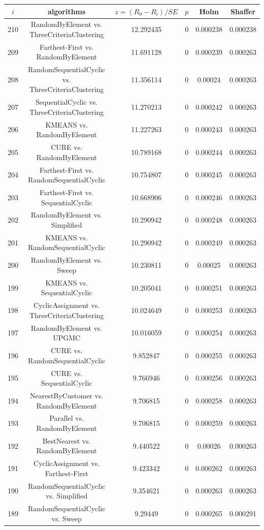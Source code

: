\documentclass[a4paper,10pt]{article}
\begin{document}
\begin{landscape}
\begin{table}[!htp]
\centering\scriptsize
\begin{tabular}{cccccc}
$i$&algorithms&$z=(R_0 - R_i)/SE$&$p$&Holm&Shaffer\\
\hline210&RandomByElement vs. ThreeCriteriaClustering&12.292435&0&0.000238&0.000238\\
209&Farthest-First vs. RandomByElement&11.691128&0&0.000239&0.000263\\
208&RandomSequentialCyclic vs. ThreeCriteriaClustering&11.356114&0&0.00024&0.000263\\
207&SequentialCyclic vs. ThreeCriteriaClustering&11.270213&0&0.000242&0.000263\\
206&KMEANS vs. RandomByElement&11.227263&0&0.000243&0.000263\\
205&CURE vs. RandomByElement&10.789168&0&0.000244&0.000263\\
204&Farthest-First vs. RandomSequentialCyclic&10.754807&0&0.000245&0.000263\\
203&Farthest-First vs. SequentialCyclic&10.668906&0&0.000246&0.000263\\
202&RandomByElement vs. Simplified&10.290942&0&0.000248&0.000263\\
201&KMEANS vs. RandomSequentialCyclic&10.290942&0&0.000249&0.000263\\
200&RandomByElement vs. Sweep&10.230811&0&0.00025&0.000263\\
199&KMEANS vs. SequentialCyclic&10.205041&0&0.000251&0.000263\\
198&CyclicAssignment vs. ThreeCriteriaClustering&10.024649&0&0.000253&0.000263\\
197&RandomByElement vs. UPGMC&10.016059&0&0.000254&0.000263\\
196&CURE vs. RandomSequentialCyclic&9.852847&0&0.000255&0.000263\\
195&CURE vs. SequentialCyclic&9.766946&0&0.000256&0.000263\\
194&NearestByCustomer vs. RandomByElement&9.706815&0&0.000258&0.000263\\
193&Parallel vs. RandomByElement&9.706815&0&0.000259&0.000263\\
192&BestNearest vs. RandomByElement&9.440522&0&0.00026&0.000263\\
191&CyclicAssignment vs. Farthest-First&9.423342&0&0.000262&0.000263\\
190&RandomSequentialCyclic vs. Simplified&9.354621&0&0.000263&0.000263\\
189&RandomSequentialCyclic vs. Sweep&9.29449&0&0.000265&0.000291\\

\end{tabular}
\end{table}
\end{landscape}
\end{document}
